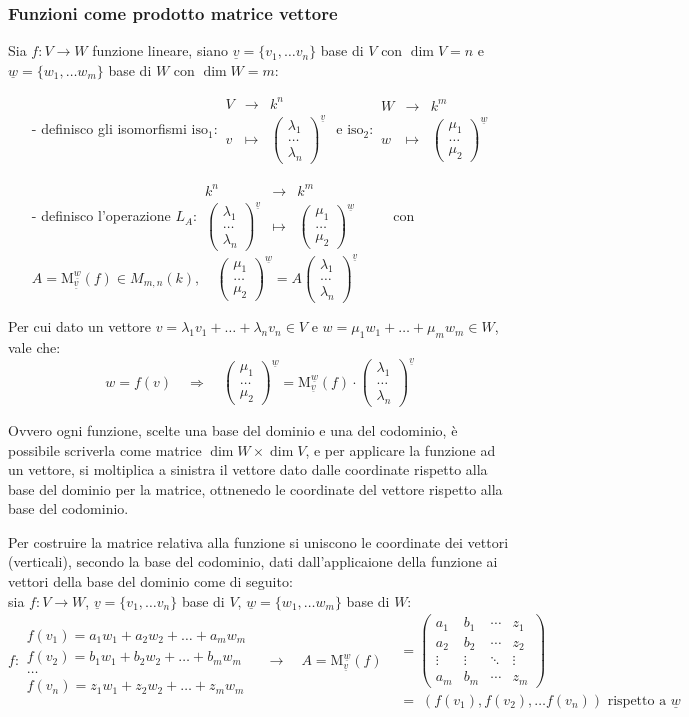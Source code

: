 \documentclass[a4paper]{article}
\newcommand\f[4]{\begin{smallmatrix} {#1} &\to &{#2} \\ {#3} &\mapsto &{#4} \end{smallmatrix}}
\newcommand\m[2]{\text{M}_{\underline{#1}}^{\underline{#2}}}
\newcommand\psmatrix[3]{\left( \begin{smallmatrix} {#1} \\ {#2} \\ {#3} \end{smallmatrix} \right)}
\begin{document}
\subsubsection*{Funzioni come prodotto matrice vettore}
Sia \(f: V \to W\) funzione lineare, siano \(\underline{v} = \{ v_1, \dots v_n \}\) base di \(V\) con \(\dim V = n\) e
\(\underline{w} = \{ w_1, \dots w_m \}\) base di \(W\) con \(\dim W = m\):
\begin{itemize}
	\item[-] definisco gli isomorfismi \(\text{iso}_1: \f{V}{k^n}{v}{\psmatrix{\lambda_1}{\dots}{\lambda_n}^{\underline{v}}}\) e \(\text{iso}_2: \f{W}{k^m}{w}{\psmatrix{\mu_1}{\dots}{\mu_2}^{\underline{w}}}\)
	\item[-] definisco l'operazione \(L_A: \f{k^n}{k^m}{\psmatrix{\lambda_1}{\dots}{\lambda_n}^{\underline{v}}}{\psmatrix{\mu_1}{\dots}{\mu_2}^{\underline{w}}} \qquad \)
	con \(A = \m{v}{w}(f) \in M_{m,n}(k), \quad \psmatrix{\mu_1}{\dots}{\mu_2}^{\underline{w}} = A \psmatrix{\lambda_1}{\dots}{\lambda_n}^{\underline{v}}\)
\end{itemize}
Per cui dato un vettore \(v = \lambda_1 v_1 + \dots + \lambda_n v_n \in V\) e \(w = \mu_1 w_1 + \dots + \mu_m w_m \in W\),
vale che: \[w = f(v) \quad \Rightarrow \quad \psmatrix{\mu_1}{\dots}{\mu_2}^{\underline{w}} = \m{v}{w}(f) \cdot \psmatrix{\lambda_1}{\dots}{\lambda_n}^{\underline{v}}\]

Ovvero ogni funzione, scelte una base del dominio e una del codominio, è possibile scriverla come matrice \(\dim W \times \dim V\),
e per applicare la funzione ad un vettore, si moltiplica a sinistra il vettore dato dalle coordinate rispetto alla base del dominio
per la matrice, ottnenedo le coordinate del vettore rispetto alla base del codominio.

Per costruire la matrice relativa alla funzione si uniscono le coordinate dei vettori (verticali), secondo la base del codominio,
dati dall'applicaione della funzione ai vettori della base del dominio come di seguito: \\
sia \(f:V \to W\), \(\underline{v} = \{v_1, \dots v_n\}\) base di \(V\), \(\underline{w} = \{w_1, \dots w_m\}\) base di \(W\):
\[f: \begin{matrix}
	f(v_1) = a_1 w_1 + a_2 w_2 + \dots + a_m w_m \\
	f(v_2) = b_1 w_1 + b_2 w_2 + \dots + b_m w_m \\
	\dots \\
	f(v_n) = z_1 w_1 + z_2 w_2 + \dots + z_m w_m
\end{matrix} \quad \longrightarrow \quad A = \m{v}{w}(f)
\begin{aligned}
	&= \left( \begin{matrix}
		a_1 & b_1 & \cdots & z_1 \\
		a_2 & b_2 & \cdots & z_2 \\
		\vdots & \vdots & \ddots & \vdots \\
		a_m & b_m & \cdots & z_m
	\end{matrix} \right) \\
	&= \; \left(f(v_1), f(v_2), \dots f(v_n)\right) \text{ rispetto a } \underline{w}
\end{aligned}\]
\end{document}
